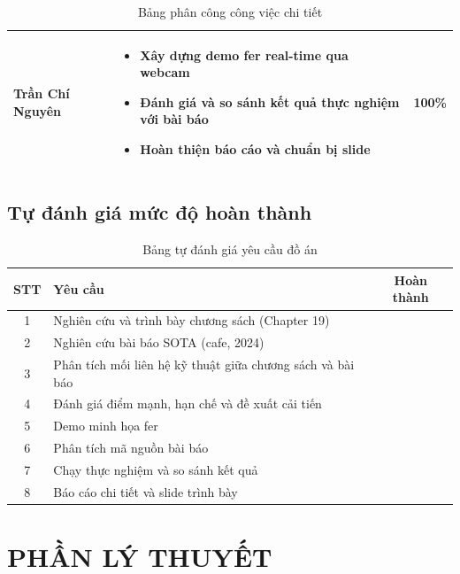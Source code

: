\documentclass[12pt,a4paper]{article}
\newcommand{\cmark}{\ding{51}}
\let\oldtextbf\textbf
\renewcommand{\textbf}[1]{\oldtextbf{\textcolor{hcmublue}{#1}}}
\begin{document}
\begin{table}[H]
\begin{tabularx}{\textwidth}{|l|X|c|}
\textbf{Trần Chí Nguyên} &
\begin{minipage}[t]{\linewidth}
\begin{itemize}[leftmargin=*,nosep,after=\strut]
    \item[-] Xây dựng demo \gls{fer} real-time qua webcam
    \item[-] Đánh giá và so sánh kết quả thực nghiệm với bài báo
    \item[-] Hoàn thiện báo cáo và chuẩn bị slide
\end{itemize}
\end{minipage} & 100\% \\ \hline

\end{tabularx}
\caption{Bảng phân công công việc chi tiết}
\label{tab:work_distribution}
\end{table}

\subsection{Tự đánh giá mức độ hoàn thành}

\begin{table}[H]
\centering
\begin{tabular}{|c|p{9cm}|c|}
\hline
\textbf{STT} & \textbf{Yêu cầu} & \textbf{Hoàn thành} \\ \hline
1 & Nghiên cứu và trình bày chương sách (Chapter 19) & \cmark \\ \hline
2 & Nghiên cứu bài báo SOTA (\gls{cafe}, 2024) & \cmark \\ \hline
3 & Phân tích mối liên hệ kỹ thuật giữa chương sách và bài báo & \cmark \\ \hline
4 & Đánh giá điểm mạnh, hạn chế và đề xuất cải tiến & \cmark \\ \hline
5 & Demo minh họa \gls{fer} & \cmark \\ \hline
6 & Phân tích mã nguồn bài báo & \cmark \\ \hline
7 & Chạy thực nghiệm và so sánh kết quả & \cmark \\ \hline
8 & Báo cáo chi tiết và slide trình bày & \cmark \\ \hline
\end{tabular}
\caption{Bảng tự đánh giá yêu cầu đồ án}
\label{tab:self_eval}
\end{table}


\section{PHẦN LÝ THUYẾT}
\end{document}
